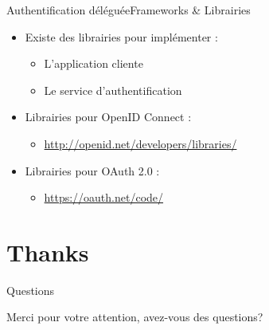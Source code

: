 \documentclass{beamer}
\begin{document}
\begin{frame}{Authentification déléguée}{Frameworks \& Librairies}
  \begin{center}
    \begin{itemize}
      \item Existe des librairies pour implémenter :
      \begin{itemize}
        \item L'application cliente
        \item Le service d'authentification
      \end{itemize}
      \item Librairies pour OpenID Connect :
      \begin{itemize}
        \item \url{http://openid.net/developers/libraries/}
      \end{itemize}
      \item Librairies pour OAuth 2.0 :
      \begin{itemize}
        \item \url{https://oauth.net/code/}
      \end{itemize}
    \end{itemize}
  \end{center}
\end{frame}

\section*{Thanks}

\begin{frame}{Questions}
  \begin{center}
    Merci pour votre attention, avez-vous des questions?
  \end{center}
\end{frame}
\end{document}
